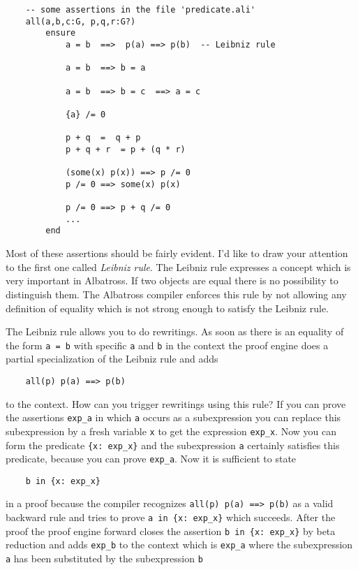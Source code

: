 \begin{lstlisting}
    -- some assertions in the file 'predicate.ali'
    all(a,b,c:G, p,q,r:G?)
        ensure
            a = b  ==>  p(a) ==> p(b)  -- Leibniz rule

            a = b  ==> b = a

            a = b  ==> b = c  ==> a = c

            {a} /= 0

            p + q  =  q + p
            p + q + r  = p + (q * r)
            
            (some(x) p(x)) ==> p /= 0
            p /= 0 ==> some(x) p(x)

            p /= 0 ==> p + q /= 0
            ...
        end
\end{lstlisting}

Most of these assertions should be fairly evident. I'd like to draw your
attention to the first one called {\em Leibniz rule}. The Leibniz rule
expresses a concept which is very important in Albatross. If two objects are
equal there is no possibility to distinguish them. The Albatross compiler
enforces this rule by not allowing any definition of equality which is not
strong enough to satisfy the Leibniz rule.

The Leibniz rule allows you to do rewritings. As soon as there is an equality
of the form \lstinline!a = b! with specific \lstinline!a! and \lstinline!b! in
the context the proof engine does a partial specialization of the Leibniz rule
and adds
%
\begin{lstlisting}
    all(p) p(a) ==> p(b)
\end{lstlisting}
%
to the context. How can you trigger rewritings using this rule? If you can
prove the assertions \lstinline!exp_a! in which \lstinline!a! occurs as a
subexpression you can replace this subexpression by a fresh variable
\lstinline!x! to get the expression \lstinline!exp_x!. Now you can form the
predicate \lstinline!{x: exp_x}! and the subexpression \lstinline!a!
certainly satisfies this predicate, because you can prove
\lstinline!exp_a!. Now it is sufficient to state
%
\begin{lstlisting}
    b in {x: exp_x}
\end{lstlisting}
%
in a proof because the compiler recognizes \lstinline!all(p) p(a) ==> p(b)! as
a valid backward rule and tries to prove \lstinline!a in {x: exp_x}! which
succeeds. After the proof the proof engine forward closes the assertion
\lstinline!b in {x: exp_x}! by beta reduction and adds \lstinline!exp_b! to
the context which is \lstinline!exp_a! where the subexpression \lstinline!a!
has been substituted by the subexpression \lstinline!b!

